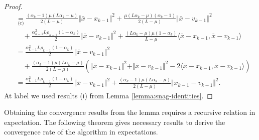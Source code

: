 \documentclass[12pt]{article}
\begin{document}
\begin{proof}
{\begin{align*}
                &\underset{\text{(c)}}{=}
                \frac{(\alpha_k - 1)\mu(L\alpha_k - \mu)}{2(L - \mu)}\Vert \bar x - x_{k - 1}\Vert^2
                + 
                \frac{\mu(L\alpha_k - \mu)(\alpha_k - 1)}{2(L - \mu)}\Vert \bar x - v_{k - 1}\Vert^2
                \\ &\quad 
                    + \frac{\alpha_{k - 1}^2L \rho_{k - 1}(1 - \alpha_k)}{2}\Vert \bar x - v_{k - 1}\Vert^2
                    + \frac{(L\alpha_k - \mu)\mu(1 - \alpha_k)}{L - \mu}\langle \bar x - x_{k - 1}, \bar x - v_{k - 1}\rangle
                \\
                &= 
                \frac{\alpha_{k - 1}^2L \rho_{k - 1}(1 - \alpha_k)}{2}\Vert \bar x - v_{k - 1}\Vert^2
                \\ & \quad
                    + \frac{(\alpha_k - 1)\mu(L\alpha_k - \mu)}{2(L - \mu)}\left(
                        \Vert \bar x - x_{k - 1}\Vert^2 + \Vert \bar x - v_{k - 1}\Vert^2 - 2\langle\bar x - x_{k - 1},\bar x - v_{k - 1} \rangle
                    \right)
                \\
                &= \frac{\alpha_{k - 1}^2L \rho_{k - 1}(1 - \alpha_k)}{2}\Vert \bar x - v_{k - 1}\Vert^2
                + \frac{(\alpha_k - 1)\mu(L\alpha_k - \mu)}{2(L - \mu)}\Vert x_{k - 1} - v_{k - 1}\Vert^2. 
            \end{align*}
            }
            At label  we used results (i) from Lemma \ref{lemma:snag-identities}. 
        \end{proof}
        Obtaining the convergence results from the lemma requires a recursive relation in expectation. 
        The following theorem gives necessary results to derive the convergence rate of the algorithm in expectations. 
\end{document}
